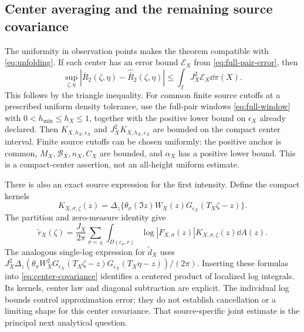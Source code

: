 \subsection{Center averaging and the remaining source covariance}

The uniformity in observation points makes the theorem compatible
with \eqref{eq:unfolding}. If each center has an error bound
$\mathcal E_X$ from \eqref{eq:full-pair-error}, then
\begin{equation}\label{eq:averaged-transfer}
 \sup_{\zeta,\eta}
   |\overline R_2(\zeta,\eta)-\widehat{\overline R}_2(\zeta,\eta)|
       \le\int_I J_X^2\mathcal E_X\dd\pi(X).
\end{equation}
This follows by the triangle inequality. For common finite source cutoffs
at a prescribed uniform density tolerance, use the full-pair windows
\eqref{eq:full-window} with $0<h_{\min}\le h_X\le1$, together with
the positive lower bound on $\epsilon_X$ already declared. Then
$K_{X,h_X,\epsilon_X}$ and $J_X^2K_{X,h_X,\epsilon_X}$ are bounded
on the compact center interval. Finite source cutoffs can be chosen uniformly: the positive anchor is common, $M_X,\mathcal B_X,n_X,C_X$
are bounded, and $\alpha_X$ has a positive lower bound. This is a
compact-center assertion, not an all-height uniform estimate.

There is also an exact source expression for the first intensity.
Define the compact kernels
\[
 K_{X,\sigma,\zeta}(z)=
  \Delta_z\{\theta_\sigma(\Im z)W_X(z)
                   G_{\epsilon_X}(T_X\zeta-z)\}.
\]
The partition and zero-measure identity give
\begin{equation}\label{eq:source-intensity}
 \widetilde r_X(\zeta)
   =\frac{J_X}{2\pi}\sum_{\sigma=\pm}
       \int_{D(c_\sigma,r)}\log|F_{X,\sigma}(z)|
                                  K_{X,\sigma,\zeta}(z)\dd A(z).
\end{equation}
The analogous single-log expression for $\widetilde d_X$ uses
$J_X^2\Delta_z(\theta_\sigma W_X^2G_{\epsilon_X}(T_X\zeta-z)
G_{\epsilon_X}(T_X\eta-z))/(2\pi)$.
Inserting these formulas into \eqref{eq:center-covariance} identifies
a centered product of localized log integrals. Its kernels, center
law and diagonal subtraction are explicit. The individual log bounds
control approximation error; they do not establish cancellation or a
limiting shape for this center covariance. That source-specific joint
estimate is the principal next analytical question.
